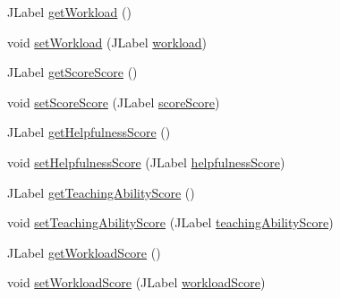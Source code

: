 \begin{DoxyCompactItemize}
\item 
J\+Label \mbox{\hyperlink{classcom_1_1_b_n_u_1_1pages_1_1_user_review_1_1_user_review_model_a129a083df2c520f53d5918318b9392e4}{get\+Workload}} ()
\item 
void \mbox{\hyperlink{classcom_1_1_b_n_u_1_1pages_1_1_user_review_1_1_user_review_model_a733aef73c4224ddbbcdf265a8eb32180}{set\+Workload}} (J\+Label \mbox{\hyperlink{classcom_1_1_b_n_u_1_1pages_1_1_user_review_1_1_user_review_model_af7a21fe3488541f9a907c5f420911ce1}{workload}})
\item 
J\+Label \mbox{\hyperlink{classcom_1_1_b_n_u_1_1pages_1_1_user_review_1_1_user_review_model_afa9681ccf6a55cfe059b6c866e355a6e}{get\+Score\+Score}} ()
\item 
void \mbox{\hyperlink{classcom_1_1_b_n_u_1_1pages_1_1_user_review_1_1_user_review_model_af0aeb461237b398fd66865d3d02c9e5a}{set\+Score\+Score}} (J\+Label \mbox{\hyperlink{classcom_1_1_b_n_u_1_1pages_1_1_user_review_1_1_user_review_model_af31ec5de5680354fd4e3a7db08065d1c}{score\+Score}})
\item 
J\+Label \mbox{\hyperlink{classcom_1_1_b_n_u_1_1pages_1_1_user_review_1_1_user_review_model_aa24378002e19a726ffa26733a1b7f898}{get\+Helpfulness\+Score}} ()
\item 
void \mbox{\hyperlink{classcom_1_1_b_n_u_1_1pages_1_1_user_review_1_1_user_review_model_adf5a4e0113e6f9d78b006e762e8642f2}{set\+Helpfulness\+Score}} (J\+Label \mbox{\hyperlink{classcom_1_1_b_n_u_1_1pages_1_1_user_review_1_1_user_review_model_a42750e8e10b6109a40d3937d68537dde}{helpfulness\+Score}})
\item 
J\+Label \mbox{\hyperlink{classcom_1_1_b_n_u_1_1pages_1_1_user_review_1_1_user_review_model_a7e256f1d5a3cc827f59e7e1807e1a760}{get\+Teaching\+Ability\+Score}} ()
\item 
void \mbox{\hyperlink{classcom_1_1_b_n_u_1_1pages_1_1_user_review_1_1_user_review_model_a8e30d3f86687a480229f6bb864954c08}{set\+Teaching\+Ability\+Score}} (J\+Label \mbox{\hyperlink{classcom_1_1_b_n_u_1_1pages_1_1_user_review_1_1_user_review_model_aef2f1e80402a3776de0547932081c41a}{teaching\+Ability\+Score}})
\item 
J\+Label \mbox{\hyperlink{classcom_1_1_b_n_u_1_1pages_1_1_user_review_1_1_user_review_model_a267eb901a56f1c23895d91acdb817c05}{get\+Workload\+Score}} ()
\item 
void \mbox{\hyperlink{classcom_1_1_b_n_u_1_1pages_1_1_user_review_1_1_user_review_model_ad4ebf81263d0711daf89d85a943079c2}{set\+Workload\+Score}} (J\+Label \mbox{\hyperlink{classcom_1_1_b_n_u_1_1pages_1_1_user_review_1_1_user_review_model_ab3c079414ba5b6f4f833951fbd028f17}{workload\+Score}})

\end{DoxyCompactItemize}

